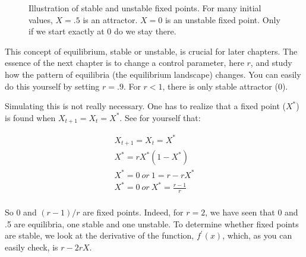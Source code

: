 \documentclass[
  a4paper,
  DIV=11,
  numbers=noendperiod,
  oneside]{scrreprt}
\begin{document}
\begin{figure}


\caption{\label{fig-ch2-img3}Illustration of stable and unstable fixed
points. For many initial values, \(X = .5\) is an attractor. \(X = 0\)
is an unstable fixed point. Only if we start exactly at 0 do we stay
there.}

\end{figure}%

This concept of equilibrium, stable or unstable, is crucial for later
chapters. The essence of the next chapter is to change a control
parameter, here \(r\), and study how the pattern of equilibria (the
equilibrium landscape) changes. You can easily do this yourself by
setting \(r = .9\). For \(r < 1\), there is only stable attractor (0).

Simulating this is not really necessary. One has to realize that a fixed
point (\(X^{*}\)) is found when \(X_{t + 1} = X_{t} = X^{*}\). See for
yourself that:

\[
\begin{gathered}
X_{t + 1} = X_{t} = X^{*} \\
X^{*} = rX^{*}( 1 - X^{*}) \\
X^{*} = 0\ or\ 1 = r - rX^{*} \\
X^{*} = 0\ or\ X^{*} = \frac{r - 1}{r} \\
\end{gathered}
\]

So 0 and \((r - 1)/r\) are fixed points. Indeed, for \(r = 2\), we have
seen that 0 and .5 are equilibria, one stable and one unstable. To
determine whether fixed points are stable, we look at the derivative of
the function, \(f^{'}(x)\), which, as you can easily check, is
\(r - 2rX\).
\end{document}
